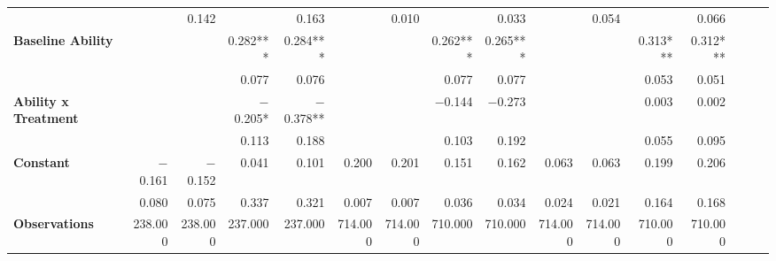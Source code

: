 \begin{tabular}{@{\extracolsep{5pt}}lrrrrrrrrrrrrrrr}
{\bf } & \phantom{***} & 0.142\phantom{\phantom{)}***} & \phantom{***} & 0.163\phantom{\phantom{)}***} & \phantom{***} & 0.010\phantom{\phantom{)}***} & \phantom{***} & 0.033\phantom{\phantom{)}***} & \phantom{***} & 0.054\phantom{\phantom{)}***} & \phantom{***} & 0.066\phantom{\phantom{)}***} \\
{\bf Baseline Ability} & \phantom{***} & \phantom{***} & 0.282\phantom{)}*** & 0.284\phantom{)}*** & \phantom{***} & \phantom{***} & 0.262\phantom{)}*** & 0.265\phantom{)}*** & \phantom{***} & \phantom{***} & 0.313\phantom{)}*** & 0.312\phantom{)}*** \\
{\bf } & \phantom{***} & \phantom{***} & 0.077\phantom{\phantom{)}***} & 0.076\phantom{\phantom{)}***} & \phantom{***} & \phantom{***} & 0.077\phantom{\phantom{)}***} & 0.077\phantom{\phantom{)}***} & \phantom{***} & \phantom{***} & 0.053\phantom{\phantom{)}***} & 0.051\phantom{\phantom{)}***} \\
{\bf Ability x Treatment} & \phantom{***} & \phantom{***} & $-$0.205\phantom{)}*\phantom{**} & $-$0.378\phantom{)}**\phantom{*} & \phantom{***} & \phantom{***} & $-$0.144\phantom{\phantom{)}***} & $-$0.273\phantom{\phantom{)}***} & \phantom{***} & \phantom{***} & 0.003\phantom{\phantom{)}***} & 0.002\phantom{\phantom{)}***} \\
{\bf } & \phantom{***} & \phantom{***} & 0.113\phantom{\phantom{)}***} & 0.188\phantom{\phantom{)}***} & \phantom{***} & \phantom{***} & 0.103\phantom{\phantom{)}***} & 0.192\phantom{\phantom{)}***} & \phantom{***} & \phantom{***} & 0.055\phantom{\phantom{)}***} & 0.095\phantom{\phantom{)}***} \\
{\bf Constant} & $-$0.161\phantom{\phantom{)}***} & $-$0.152\phantom{\phantom{)}***} & 0.041\phantom{\phantom{)}***} & 0.101\phantom{\phantom{)}***} & 0.200\phantom{\phantom{)}***} & 0.201\phantom{\phantom{)}***} & 0.151\phantom{\phantom{)}***} & 0.162\phantom{\phantom{)}***} & 0.063\phantom{\phantom{)}***} & 0.063\phantom{\phantom{)}***} & 0.199\phantom{\phantom{)}***} & 0.206\phantom{\phantom{)}***} \\
{\bf } & 0.080\phantom{\phantom{)}***} & 0.075\phantom{\phantom{)}***} & 0.337\phantom{\phantom{)}***} & 0.321\phantom{\phantom{)}***} & 0.007\phantom{\phantom{)}***} & 0.007\phantom{\phantom{)}***} & 0.036\phantom{\phantom{)}***} & 0.034\phantom{\phantom{)}***} & 0.024\phantom{\phantom{)}***} & 0.021\phantom{\phantom{)}***} & 0.164\phantom{\phantom{)}***} & 0.168\phantom{\phantom{)}***} \\
{\bf Observations} & 238.000\phantom{\phantom{)}***} & 238.000\phantom{\phantom{)}***} & 237.000\phantom{\phantom{)}***} & 237.000\phantom{\phantom{)}***} & 714.000\phantom{\phantom{)}***} & 714.000\phantom{\phantom{)}***} & 710.000\phantom{\phantom{)}***} & 710.000\phantom{\phantom{)}***} & 714.000\phantom{\phantom{)}***} & 714.000\phantom{\phantom{)}***} & 710.000\phantom{\phantom{)}***} & 710.000\phantom{\phantom{)}***} \\

\end{tabular}
